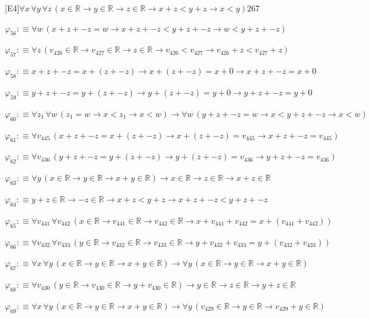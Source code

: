 \begin{fullproof}{[E4]}{$\forall x\,\forall y\,\forall z\,(x \in \mathbb{R} \to y \in \mathbb{R} \to z \in \mathbb{R} \to x + z < y + z \to x < y)$}{267}
\begin{abbrevlist}
\item $\varphi_{56} :\equiv \forall w\,(x + z + -z = w \to x + z + -z < y + z + -z \to w < y + z + -z)$
\item $\varphi_{57} :\equiv \forall z\,(v_{426} \in \mathbb{R} \to v_{427} \in \mathbb{R} \to z \in \mathbb{R} \to v_{426} < v_{427} \to v_{426} + z < v_{427} + z)$
\item $\varphi_{58} :\equiv x + z + -z = x + (z + -z) \to x + (z + -z) = x + 0 \to x + z + -z = x + 0$
\item $\varphi_{59} :\equiv y + z + -z = y + (z + -z) \to y + (z + -z) = y + 0 \to y + z + -z = y + 0$
\item $\varphi_{60} :\equiv \forall z_{1}\,\forall w\,(z_{1} = w \to x < z_{1} \to x < w) \to \forall w\,(y + z + -z = w \to x < y + z + -z \to x < w)$
\item $\varphi_{61} :\equiv \forall v_{445}\,(x + z + -z = x + (z + -z) \to x + (z + -z) = v_{445} \to x + z + -z = v_{445})$
\item $\varphi_{62} :\equiv \forall v_{436}\,(y + z + -z = y + (z + -z) \to y + (z + -z) = v_{436} \to y + z + -z = v_{436})$
\item $\varphi_{63} :\equiv \forall y\,(x \in \mathbb{R} \to y \in \mathbb{R} \to x + y \in \mathbb{R}) \to x \in \mathbb{R} \to z \in \mathbb{R} \to x + z \in \mathbb{R}$
\item $\varphi_{64} :\equiv y + z \in \mathbb{R} \to -z \in \mathbb{R} \to x + z < y + z \to x + z + -z < y + z + -z$
\item $\varphi_{65} :\equiv \forall v_{441}\,\forall v_{442}\,(x \in \mathbb{R} \to v_{441} \in \mathbb{R} \to v_{442} \in \mathbb{R} \to x + v_{441} + v_{442} = x + (v_{441} + v_{442}))$
\item $\varphi_{66} :\equiv \forall v_{432}\,\forall v_{433}\,(y \in \mathbb{R} \to v_{432} \in \mathbb{R} \to v_{433} \in \mathbb{R} \to y + v_{432} + v_{433} = y + (v_{432} + v_{433}))$
\item $\varphi_{67} :\equiv \forall x\,\forall y\,(x \in \mathbb{R} \to y \in \mathbb{R} \to x + y \in \mathbb{R}) \to \forall y\,(x \in \mathbb{R} \to y \in \mathbb{R} \to x + y \in \mathbb{R})$
\item $\varphi_{68} :\equiv \forall v_{430}\,(y \in \mathbb{R} \to v_{430} \in \mathbb{R} \to y + v_{430} \in \mathbb{R}) \to y \in \mathbb{R} \to z \in \mathbb{R} \to y + z \in \mathbb{R}$
\item $\varphi_{69} :\equiv \forall x\,\forall y\,(x \in \mathbb{R} \to y \in \mathbb{R} \to x + y \in \mathbb{R}) \to \forall y\,(v_{429} \in \mathbb{R} \to y \in \mathbb{R} \to v_{429} + y \in \mathbb{R})$

\end{abbrevlist}
\end{fullproof}
